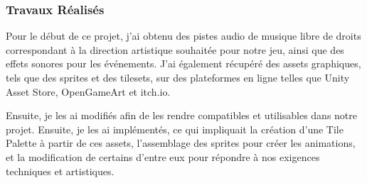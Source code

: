 \documentclass[a4page, 14pt]{extarticle}
\begin{document}
        \subsubsection{Travaux Réalisés} {
Pour le début de ce projet, j’ai obtenu des pistes audio de musique libre de droits correspondant à la direction artistique souhaitée pour notre jeu, ainsi que des effets sonores pour les événements. J’ai également récupéré des assets graphiques, tels que des sprites et des tilesets, sur des plateformes en ligne telles que Unity Asset Store, OpenGameArt et itch.io.

        Ensuite, je les ai modifiés afin de les rendre compatibles et utilisables dans notre projet. Ensuite, je les ai implémentés, ce qui impliquait la création d'une Tile Palette à partir de ces assets, l'assemblage des sprites pour créer les animations, et la modification de certains d’entre eux pour répondre à nos exigences techniques et artistiques.


}
\end{document}
